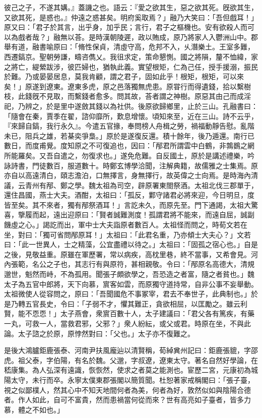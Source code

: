 \begin{pinyinscope}
彼己之子，不遂其媾。』蓋譏之也。語云：『愛之欲其生，惡之欲其死。旣欲其生，又欲其死，是惑也。』仲遠之惑甚矣。明府奚取焉？」融乃大笑曰：「吾但戲耳！」原又曰：「君子於其言，出乎身，加乎民；言行，君子之樞機也。安有欲殺人而可以為戲者哉？」融無以荅。是時漢朝陵遲，政以賄成，原乃將家人入鬱洲山中。郡舉有道，融書喻原曰：「脩性保貞，清虛守高，危邦不入，乆潛樂土。王室多難，西遷鎬京。聖朝勞謙，疇咨儁乂。我徂求定，策命懇惻。國之將隕，釐不恤緯，家之將亡，緹縈跋涉，彼匹婦也，猶執此義。實望根矩，仁為己任，授手援溺，振民於難。乃或晏晏居息，莫我肯顧，謂之君子，固如此乎！根矩，根矩，可以來矣！」原遂到遼東。遼東多虎，原之邑落獨無虎患。原甞行而得遺錢，拾以繫樹枝，此錢旣不見取，而繫錢者愈多。問其故，荅者謂之神樹。原惡其由己而成淫祀，乃辨之，於是里中遂斂其錢以為社供。後原欲歸鄉里，止於三山。孔融書曰：「隨會在秦，賈季在翟，諮仰靡所，歎息增懷。頃知來至，近在三山。詩不云乎，『來歸自鎬，我行永久』。今遣五官掾，奉問榜人舟楫之勞，禍福動靜告慰。亂階未已，阻兵之雄，若棊奕爭梟。」原於是遂復反還。積十餘年，後乃遁還。南行已數日，而度甫覺。度知原之不可復追也，因曰：「邴君所謂雲中白鶴，非鶉鷃之網所能羅矣。又吾自遣之，勿復求也。」遂免危難。自反國土，原於是講述禮樂，吟詠詩書，門徒數百，服道數十。時鄭玄博學洽聞，注解典籍，故儒雅之士集焉。原亦自以高遠清白，頤志澹泊，口無擇言，身無擇行，故英偉之士向焉。是時海內清議，云青州有邴、鄭之學。魏太祖為司空，辟原署東閤祭酒。太祖北伐三郡單于，還住昌國，燕士大夫。酒酣，太祖曰：「孤反，鄴守諸君必將來迎，今日明旦，度皆至矣。其不來者，獨有邴祭酒耳！」言訖未久，而原先至。門下通謁，太祖大驚喜，擥履而起，遠出迎原曰：「賢者誠難測度！孤謂君將不能來，而遠自屈，誠副饑虛之心。」謁訖而出，軍中士大夫詣原者數百人。太祖怪而問之，時荀文若在坐，對曰：「獨可省問邴原耳！」太祖曰：「此君名重，乃亦傾士大夫心？」文若曰：「此一世異人，士之精藻，公宜盡禮以待之。」太祖曰：「固孤之宿心也。」自是之後，見敬益重。原雖在軍歷署，常以病疾，高枕里巷，終不當事，又希會見。河內張範，名公之子也，其志行有與原符，甚相親敬。令曰：「邴原名高德大，清規邈世，魁然而峙，不為孤用。聞張子頗欲學之，吾恐造之者富，隨之者貧也。」魏太子為五官中郎將，天下向慕，賔客如雲，而原獨守道持常，自非公事不妄舉動。太祖微使人從容問之，原曰：「吾聞國危不事冢宰，君去不奉世子，此典制也。」於是乃轉五官長史，令曰：「子弱不才，懼其難正，貪欲相屈，以匡勵之。雖云利賢，能不恧恧！」太子燕會，衆賔百數十人，太子建議曰：「君父各有篤疾，有藥一丸，可救一人，當救君邪，父邪？」衆人紛紜，或父或君。時原在坐，不與此論。太子諮之於原，原悖然對曰：「父也。」太子亦不復難之。

是後大鴻臚鉅鹿張泰、河南尹扶風龐辿以清賢稱，荀綽兾州記曰：鉅鹿張貔，字邵虎。祖父泰，字伯陽，有名於魏。父邈，字叔遼，遼東太守。著名自然好學論，在嵇康集。為人弘深有遠識，恢恢然，使求之者莫之能測也。宦歷二宮，元康初為城陽太守，未行而卒。永寧太僕東郡張閣以簡質聞。杜恕著家戒稱閣曰：「張子臺，視之似鄙樸人，然其心中不知天地間何者為美，何者為好，敦然似如與陰陽合德者。作人如此，自可不富貴，然而患禍當何從而來？世有高亮如子臺者，皆多力慕，體之不如也。」


\end{pinyinscope}